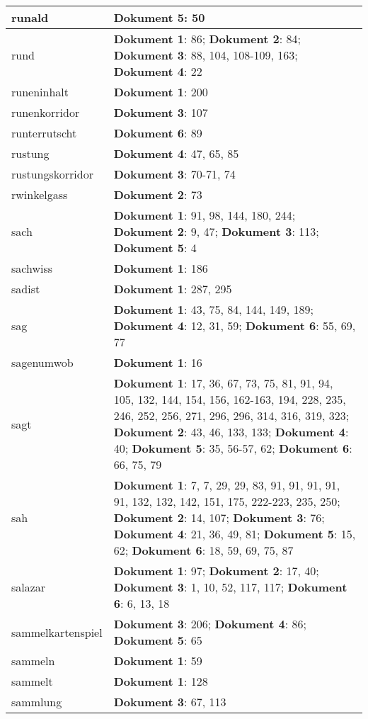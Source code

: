 \documentclass[a5paper]{article}
\begin{document}
\begin{longtable}[l]{|l|p{3in}|}
\hline
runald & \textbf{Dokument 5}: 50 \\
\hline
rund & \textbf{Dokument 1}: 86; \textbf{Dokument 2}: 84; \textbf{Dokument 3}: 88, 104, 108-109, 163; \textbf{Dokument 4}: 22 \\
\hline
runeninhalt & \textbf{Dokument 1}: 200 \\
\hline
runenkorridor & \textbf{Dokument 3}: 107 \\
\hline
runterrutscht & \textbf{Dokument 6}: 89 \\
\hline
rustung & \textbf{Dokument 4}: 47, 65, 85 \\
\hline
rustungskorridor & \textbf{Dokument 3}: 70-71, 74 \\
\hline
rwinkelgass & \textbf{Dokument 2}: 73 \\
\hline
sach & \textbf{Dokument 1}: 91, 98, 144, 180, 244; \textbf{Dokument 2}: 9, 47; \textbf{Dokument 3}: 113; \textbf{Dokument 5}: 4 \\
\hline
sachwiss & \textbf{Dokument 1}: 186 \\
\hline
sadist & \textbf{Dokument 1}: 287, 295 \\
\hline
sag & \textbf{Dokument 1}: 43, 75, 84, 144, 149, 189; \textbf{Dokument 4}: 12, 31, 59; \textbf{Dokument 6}: 55, 69, 77 \\
\hline
sagenumwob & \textbf{Dokument 1}: 16 \\
\hline
sagt & \textbf{Dokument 1}: 17, 36, 67, 73, 75, 81, 91, 94, 105, 132, 144, 154, 156, 162-163, 194, 228, 235, 246, 252, 256, 271, 296, 296, 314, 316, 319, 323; \textbf{Dokument 2}: 43, 46, 133, 133; \textbf{Dokument 4}: 40; \textbf{Dokument 5}: 35, 56-57, 62; \textbf{Dokument 6}: 66, 75, 79 \\
\hline
sah & \textbf{Dokument 1}: 7, 7, 29, 29, 83, 91, 91, 91, 91, 91, 132, 132, 142, 151, 175, 222-223, 235, 250; \textbf{Dokument 2}: 14, 107; \textbf{Dokument 3}: 76; \textbf{Dokument 4}: 21, 36, 49, 81; \textbf{Dokument 5}: 15, 62; \textbf{Dokument 6}: 18, 59, 69, 75, 87 \\
\hline
salazar & \textbf{Dokument 1}: 97; \textbf{Dokument 2}: 17, 40; \textbf{Dokument 3}: 1, 10, 52, 117, 117; \textbf{Dokument 6}: 6, 13, 18 \\
\hline
sammelkartenspiel & \textbf{Dokument 3}: 206; \textbf{Dokument 4}: 86; \textbf{Dokument 5}: 65 \\
\hline
sammeln & \textbf{Dokument 1}: 59 \\
\hline
sammelt & \textbf{Dokument 1}: 128 \\
\hline
sammlung & \textbf{Dokument 3}: 67, 113 \\

\end{longtable}
\end{document}

